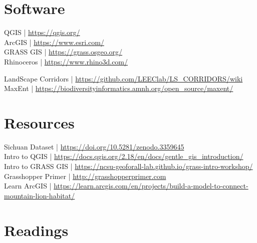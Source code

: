 \documentclass[11pt,article,oneside]{memoir}
\begin{document}
\section{Software}
\begin{multicols}{2}
\raggedright
QGIS | \url{https://qgis.org/} \\
ArcGIS | \url{https://www.esri.com/} \\
GRASS GIS | \url{https://grass.osgeo.org/} \\
Rhinoceros | \url{https://www.rhino3d.com/}
\end{multicols}\vspace*{-0.4cm}
\noindent
LandScape Corridors | \url{https://github.com/LEEClab/LS_CORRIDORS/wiki}\\
MaxEnt | \url{https://biodiversityinformatics.amnh.org/open_source/maxent/}

\section{Resources}
Sichuan Dataset | \url{https://doi.org/10.5281/zenodo.3359645}\\
Intro to QGIS | \url{https://docs.qgis.org/2.18/en/docs/gentle_gis_introduction/}\\
Intro to GRASS GIS | \url{https://ncsu-geoforall-lab.github.io/grass-intro-workshop/}\\
Grasshopper Primer | \url{http://grasshopperprimer.com}\\
Learn ArcGIS | \url{https://learn.arcgis.com/en/projects/build-a-model-to-connect-mountain-lion-habitat/}


\section{Readings}
\vspace*{0.25cm}
\nocite{*}
\setlength{}
\end{document}
